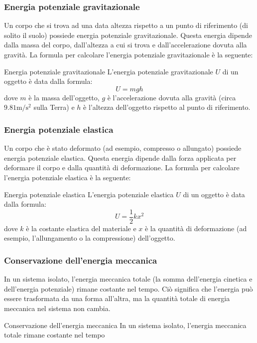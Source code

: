 \subsubsection{Energia potenziale gravitazionale}
Un corpo che si trova ad una data altezza rispetto a un punto di riferimento (di solito il suolo) possiede energia potenziale gravitazionale. Questa energia dipende dalla massa del corpo, dall'altezza a cui si trova e dall'accelerazione dovuta alla gravità. La formula per calcolare l'energia potenziale gravitazionale è la seguente:
\begin{definizione}{Energia potenziale gravitazionale}
	L'energia potenziale gravitazionale $ U $ di un oggetto è data dalla formula:
	\[
		U = m g h
	\]
	dove $ m $ è la massa dell'oggetto, $ g $ è l'accelerazione dovuta alla gravità (circa $ 9.81 \operatorname{m/s^2} $ sulla Terra) e $ h $ è l'altezza dell'oggetto rispetto al punto di riferimento.

\end{definizione}

\subsubsection{Energia potenziale elastica}
Un corpo che è stato deformato (ad esempio, compresso o allungato) possiede energia potenziale elastica. Questa energia dipende dalla forza applicata per deformare il corpo e dalla quantità di deformazione. La formula per calcolare l'energia potenziale elastica è la seguente:
\begin{definizione}{Energia potenziale elastica}
	L'energia potenziale elastica $ U $ di un oggetto è data dalla formula:
	\[
		U = \frac{1}{2} k x^2
	\]
	dove $ k $ è la costante elastica del materiale e $ x $ è la quantità di deformazione (ad esempio, l'allungamento o la compressione) dell'oggetto.
\end{definizione}
\subsubsection{Conservazione dell'energia meccanica}
In un sistema isolato, l'energia meccanica totale (la somma dell'energia cinetica e dell'energia potenziale) rimane costante nel tempo. Ciò significa che l'energia può essere trasformata da una forma all'altra, ma la quantità totale di energia meccanica nel sistema non cambia.
\begin{teorema}{Conservazione dell'energia meccanica}
	In un sistema isolato, l'energia meccanica totale rimane costante nel tempo
\end{teorema}

